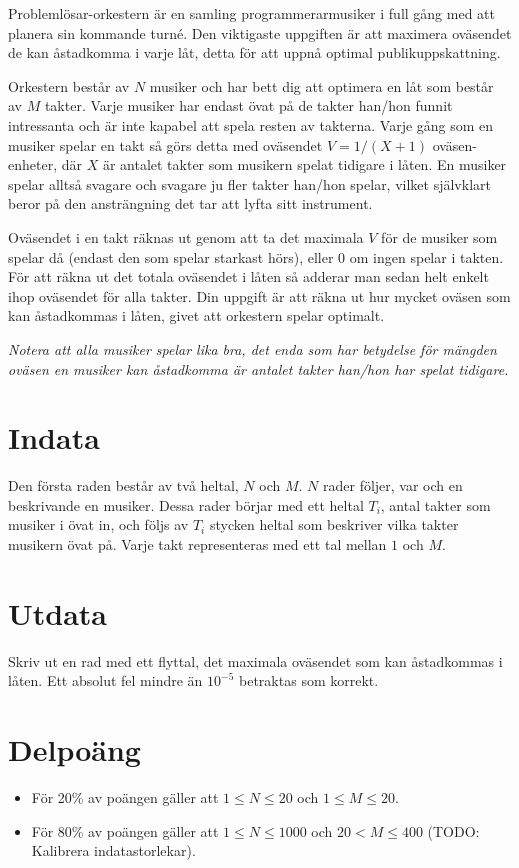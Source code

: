 
Problemlösar-orkestern är en samling programmerarmusiker i full gång med att planera sin kommande turné. Den viktigaste uppgiften är att maximera oväsendet de kan åstadkomma i varje låt, detta för att uppnå optimal publikuppskattning.

Orkestern består av $N$ musiker och har bett dig att optimera en låt som består av $M$ takter. Varje musiker har endast övat på de takter han/hon funnit intressanta och är inte kapabel att spela resten av takterna. Varje gång som en musiker spelar en takt så görs detta med oväsendet $V=1/(X+1)$ oväsen-enheter, där $X$ är antalet takter som musikern spelat tidigare i låten. En musiker spelar alltså svagare och svagare ju fler takter han/hon spelar, vilket självklart beror på den ansträngning det tar att lyfta sitt instrument.

Oväsendet i en takt räknas ut genom att ta det maximala $V$ för de musiker som spelar då (endast den som spelar starkast hörs), eller $0$ om ingen spelar i takten. För att räkna ut det totala oväsendet i låten så adderar man sedan helt enkelt ihop oväsendet för alla takter. Din uppgift är att räkna ut hur mycket oväsen som kan åstadkommas i låten, givet att orkestern spelar optimalt.

\emph{Notera att alla musiker spelar lika bra, det enda som har betydelse för mängden oväsen en musiker kan åstadkomma är antalet takter han/hon har spelat tidigare.}

\section*{Indata}
Den första raden består av två heltal, $N$ och $M$. $N$ rader följer, var och en beskrivande en musiker. Dessa rader börjar med ett heltal $T_i$, antal takter som musiker i övat in, och följs av $T_i$ stycken heltal som beskriver vilka takter musikern övat på. Varje takt representeras med ett tal mellan $1$ och $M$.

\section*{Utdata}
Skriv ut en rad med ett flyttal, det maximala oväsendet som kan åstadkommas i låten. Ett absolut fel mindre än $10^{-5}$ betraktas som korrekt.

\section*{Delpoäng}
\begin{itemize}
\item För 20\% av poängen gäller att $1 \leq N \leq 20$ och $1 \leq M \leq 20$.
\item För 80\% av poängen gäller att $1 \leq N \leq 1000$ och $20 < M \leq 400$ (TODO: Kalibrera indatastorlekar).
\end{itemize}

